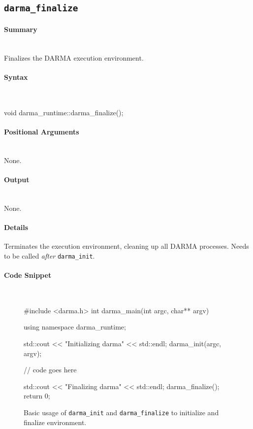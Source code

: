 
\subsection{\texttt{darma\_finalize}}
\label{ssec:api_fe_finalize}

\paragraph{Summary}\mbox{}\\
Finalizes the DARMA execution environment.

\paragraph{Syntax}\mbox{}\\ 
\begin{CppCode}
void darma_runtime::darma_finalize();
\end{CppCode}

\paragraph{Positional Arguments}\mbox{} \\
None. 

\paragraph{Output}\mbox{} \\
None. 

\paragraph{Details}\mbox{} 
Terminates the execution environment, cleaning up all DARMA processes.
Needs to be called {\it after} \texttt{darma\_init}.


\paragraph{Code Snippet}\mbox{} \\
\begin{figure}[!h]
\begin{CppCodeNumb}
#include <darma.h>
int darma_main(int argc, char** argv)
{
  using namespace darma_runtime;

  std::cout << "Initializing darma" << std::endl;
  darma_init(argc, argv);

  // code goes here

  std::cout << "Finalizing darma" << std::endl;
  darma_finalize();
  return 0;
}
\end{CppCodeNumb}
\caption{Basic usage of \texttt{darma\_init} and \texttt{darma\_finalize} 
to initialize and finalize environment.}
\label{fig:fe_api_init}
\end{figure}






